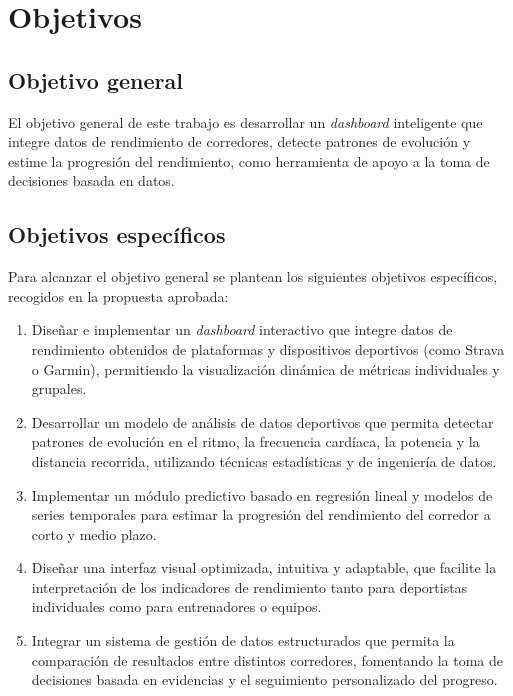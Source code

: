 \chapter{Objetivos}
\label{ch:objetivos}


\section{Objetivo general}
\label{sec:objetivo_general}

El objetivo general de este trabajo es desarrollar un \textit{dashboard} inteligente que integre datos de rendimiento de corredores, detecte patrones de evolución y estime la progresión del rendimiento, como herramienta de apoyo a la toma de decisiones basada en datos.

\section{Objetivos específicos}
\label{sec:objetivos_especificos}

Para alcanzar el objetivo general se plantean los siguientes objetivos específicos, recogidos en la propuesta aprobada:

\begin{enumerate}[label=\textbf{O\arabic*.}, leftmargin=*]
    \item \label{obj:dashboard} Diseñar e implementar un \textit{dashboard} interactivo que integre datos de rendimiento obtenidos de plataformas y dispositivos deportivos (como Strava o Garmin), permitiendo la visualización dinámica de métricas individuales y grupales.
    \item \label{obj:analisis} Desarrollar un modelo de análisis de datos deportivos que permita detectar patrones de evolución en el ritmo, la frecuencia cardíaca, la potencia y la distancia recorrida, utilizando técnicas estadísticas y de ingeniería de datos.
    \item \label{obj:prediccion} Implementar un módulo predictivo basado en regresión lineal y modelos de series temporales para estimar la progresión del rendimiento del corredor a corto y medio plazo.
    \item \label{obj:interfaz} Diseñar una interfaz visual optimizada, intuitiva y adaptable, que facilite la interpretación de los indicadores de rendimiento tanto para deportistas individuales como para entrenadores o equipos.
    \item \label{obj:datos} Integrar un sistema de gestión de datos estructurados que permita la comparación de resultados entre distintos corredores, fomentando la toma de decisiones basada en evidencias y el seguimiento personalizado del progreso.
\end{enumerate}

